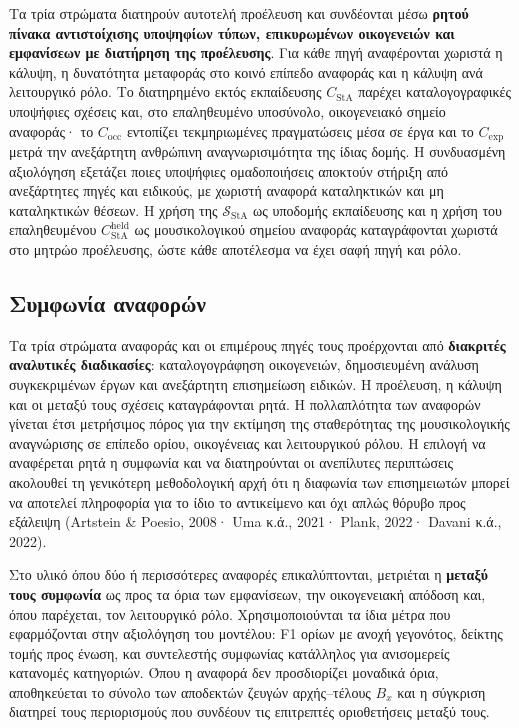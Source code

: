 \documentclass[11pt,a4paper]{article}
\begin{document}
Τα τρία στρώματα διατηρούν αυτοτελή προέλευση και συνδέονται μέσω \textbf{ρητού πίνακα αντιστοίχισης υποψηφίων τύπων, επικυρωμένων οικογενειών και εμφανίσεων με διατήρηση της προέλευσης}. Για κάθε πηγή αναφέρονται χωριστά η κάλυψη, η δυνατότητα μεταφοράς στο κοινό επίπεδο αναφοράς και η κάλυψη ανά λειτουργικό ρόλο. Το διατηρημένο εκτός εκπαίδευσης \(C_{\mathrm{StA}}\) παρέχει καταλογογραφικές υποψήφιες σχέσεις και, στο επαληθευμένο υποσύνολο, οικογενειακό σημείο αναφοράς· το \(C_{\mathrm{occ}}\) εντοπίζει τεκμηριωμένες πραγματώσεις μέσα σε έργα και το \(C_{\mathrm{exp}}\) μετρά την ανεξάρτητη ανθρώπινη αναγνωρισιμότητα της ίδιας δομής. Η συνδυασμένη αξιολόγηση εξετάζει ποιες υποψήφιες ομαδοποιήσεις αποκτούν στήριξη από ανεξάρτητες πηγές και ειδικούς, με χωριστή αναφορά καταληκτικών και μη καταληκτικών θέσεων. Η χρήση της $\mathcal S_{\mathrm{StA}}$ ως υποδομής εκπαίδευσης και η χρήση του επαληθευμένου $C_{\mathrm{StA}}^{\mathrm{held}}$ ως μουσικολογικού σημείου αναφοράς καταγράφονται χωριστά στο μητρώο προέλευσης, ώστε κάθε αποτέλεσμα να έχει σαφή πηγή και ρόλο.

\subsection{Συμφωνία αναφορών}\label{app:corpora-agreement}

Τα τρία στρώματα αναφοράς και οι επιμέρους πηγές τους προέρχονται από \textbf{διακριτές αναλυτικές διαδικασίες}: καταλογογράφηση οικογενειών, δημοσιευμένη ανάλυση συγκεκριμένων έργων και ανεξάρτητη επισημείωση ειδικών. Η προέλευση, η κάλυψη και οι μεταξύ τους σχέσεις καταγράφονται ρητά. Η πολλαπλότητα των αναφορών γίνεται έτσι μετρήσιμος πόρος για την εκτίμηση της σταθερότητας της μουσικολογικής αναγνώρισης σε επίπεδο ορίου, οικογένειας και λειτουργικού ρόλου. Η επιλογή να αναφέρεται ρητά η συμφωνία και να διατηρούνται οι ανεπίλυτες περιπτώσεις ακολουθεί τη γενικότερη μεθοδολογική αρχή ότι η διαφωνία των επισημειωτών μπορεί να αποτελεί πληροφορία για το ίδιο το αντικείμενο και όχι απλώς θόρυβο προς εξάλειψη (Artstein \& Poesio, 2008· Uma κ.ά., 2021· Plank, 2022· Davani κ.ά., 2022).

Στο υλικό όπου δύο ή περισσότερες αναφορές επικαλύπτονται, μετριέται η \textbf{μεταξύ τους συμφωνία} ως προς τα όρια των εμφανίσεων, την οικογενειακή απόδοση και, όπου παρέχεται, τον λειτουργικό ρόλο. Χρησιμοποιούνται τα ίδια μέτρα που εφαρμόζονται στην αξιολόγηση του μοντέλου: F1 ορίων με ανοχή γεγονότος, δείκτης τομής προς ένωση, και συντελεστής συμφωνίας κατάλληλος για ανισομερείς κατανομές κατηγοριών. Όπου η αναφορά δεν προσδιορίζει μοναδικά όρια, αποθηκεύεται το σύνολο των αποδεκτών ζευγών αρχής--τέλους $B_x$ και η σύγκριση διατηρεί τους περιορισμούς που συνδέουν τις επιτρεπτές οριοθετήσεις μεταξύ τους.
\end{document}
